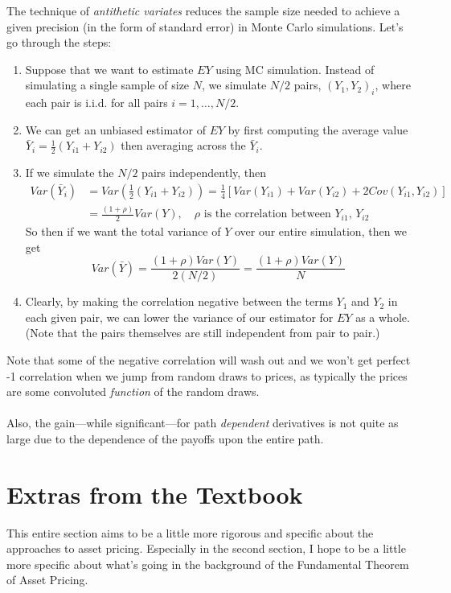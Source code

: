 \documentclass[12pt]{article}
\theoremstyle{plain}
\theoremstyle{definition}
\theoremstyle{remark}
\begin{document}
The technique of \emph{antithetic variates} reduces the sample
size needed to achieve a given precision (in the form of standard error)
in Monte Carlo simulations. Let's go through the steps:
\begin{enumerate}
   \item{Suppose that we want to estimate $EY$ using MC simulation. 
      Instead of simulating a single sample of size $N$, we simulate
      $N/2$ pairs, $(Y_1, Y_2)_i$, where each pair is i.i.d. for
      all pairs $i=1,\ldots,N/2$.}
   \item{We can get an unbiased estimator of $EY$ by first
      computing the average value $\bar{Y}_i = 
      \frac{1}{2}(Y_{i1}+ Y_{i2})$
      then averaging across the $\bar{Y}_i$.} 
   \item{If we simulate the $N/2$ pairs independently, then 
      \begin{align*}
	 Var(\bar{Y}_i) &= Var\left(\frac{1}{2}(Y_{i1}+ Y_{i2})\right) =
	 \frac{1}{4}\left[Var(Y_{i1})+Var(Y_{i2})+2 Cov(Y_{i1}, Y_{i2})
	 \right]
	 \\
	 &=  \frac{(1+\rho)}{2} Var(Y), \quad \text{$\rho$ is the 
	    correlation between $Y_{i1}$, $Y_{i2}$}
      \end{align*}
      So then if we want the total variance of $Y$ over our entire 
      simulation, then we get 
	 \[ Var(\bar{Y}) = \frac{(1+\rho) Var(Y)}{ 2 (N/2)}
	    = \frac{(1+\rho) Var(Y)}{N} \]
      }
   \item{Clearly, by making the correlation negative between the 
      terms $Y_1$ and $Y_2$ in each given pair, we can lower the variance
      of our estimator for $EY$ as a whole.  (Note that the pairs
      themselves are still independent from pair to pair.)}
\end{enumerate}
Note that some of the negative correlation will wash out and we
won't get perfect -1 correlation when we jump from random draws to
prices, as typically the prices are some convoluted \emph{function}
of the random draws.
\\
\\
Also, the gain---while significant---for path \emph{dependent} 
derivatives is not quite as large due to the dependence of the payoffs
upon the entire path.

\newpage
\section{Extras from the Textbook}


This entire section aims to be a little more rigorous and specific
about the approaches to asset pricing.  Especially in the second
section, I hope to be a little more specific about what's going in
the background of the Fundamental Theorem of Asset Pricing.
\end{document}
